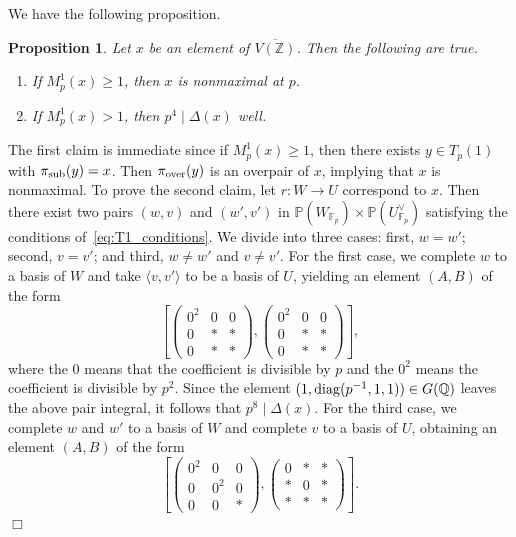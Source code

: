 \documentclass{article}
\def\Z{{\mathbb Z}}
\def\P{{\mathbb P}}
\def\over{{\rm over}}
\def\sub{{\rm sub}}
\def\diag{{\rm diag}}
\def\F{{\mathbb F}}
\def\Q{{\mathbb Q}}
\def\Z{{\mathbb Z}}
\def\P{{\mathbb P}}
\def\F{{\mathbb F}}
\def\Q{{\mathbb Q}}
\def\ol{\overline}
\newtheorem{proposition}[theorem]{Proposition}
\newenvironment{proof}{\noindent {\bf Proof:}}{$\Box$ \vspace{2 ex}}
\begin{document}
We have the following proposition.
\begin{proposition}\label{prop:Mp1_prelim}
Let $x$ be an element of $\ol{V(\Z)}$. Then the following are true.
\begin{enumerate}
\item If $M_p^1(x)\geq 1$, then $x$ is nonmaximal at $p$.
\item If $M_p^1(x)> 1$, then $p^4\mid\Delta(x)$ well.
\end{enumerate}
\end{proposition}
\begin{proof}
The first claim is immediate since if $M_p^1(x)\geq 1$, then there exists $y\in T_p(1)$ with $\pi_\sub(y)=x$. Then $\pi_\over(y)$ is an overpair of $x$, implying that $x$ is nonmaximal. 
To prove the second claim, let $r:W\to U$ correspond to $x$. Then there exist two pairs $(w,v)$ and $(w',v')$ in $\P(W_{\F_p})\times\P(U^\vee_{\F_p})$ satisfying the conditions of~\eqref{eq:T1_conditions}. We divide into three cases: first, $w=w'$; second, $v=v'$; and third, $w\neq w'$ and $v\neq v'$. For the first case, we complete $w$ to a basis of $W$ and take $\langle v,v'\rangle$ to be a basis of $U$, yielding an element $(A,B)$ of the form
\begin{equation*}
\left[\begin{pmatrix}0^2&{0}&{0}\\{0}&{*}&{*}\\{0}&{*}&{*}\end{pmatrix},\begin{pmatrix} 0^2&0&0\\0&{*}&{*}\\0&{*}&{*}\end{pmatrix}\right],
\end{equation*}
where the $0$ means that the coefficient is divisible by $p$ and the $0^2$ means the coefficient is divisible by $p^2$.
Since the element $(1,\diag(p^{-1},1,1))\in G(\Q)$ leaves the above pair integral, it follows that $p^8\mid\Delta(x)$.
For the third case, we complete $w$ and $w'$ to a basis of $W$ and complete $v$ to a basis of $U$, obtaining an element $(A,B)$ of the form
\begin{equation*}
\left[\begin{pmatrix}0^2&{0}&{0}\\{0}&{0^2}&{0}\\{0}&{0}&{*}\end{pmatrix},\begin{pmatrix} 0&{*}&{*}\\{*}&{0}&{*}\\{*}&{*}&{*}\end{pmatrix}\right].

\end{equation*}
\end{proof}
\end{document}
